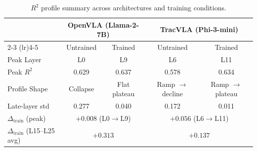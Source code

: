 \begin{table}[t]
\centering
\caption{$R^2$ profile summary across architectures and training conditions.}
\label{tab:2x2_r2_summary}
\begin{tabular}{lcccc}
\toprule
 & \multicolumn{2}{c}{OpenVLA (Llama-2-7B)} & \multicolumn{2}{c}{TracVLA (Phi-3-mini)} \\
\cmidrule(lr){2-3} \cmidrule(lr){4-5}
 & Untrained & Trained & Untrained & Trained \\
\midrule
Peak Layer       & L0          & L9          & L6          & L11         \\
Peak $R^2$       & 0.629       & 0.637       & 0.578       & 0.634       \\
Profile Shape    & Collapse    & Flat plateau & Ramp $\to$ decline & Ramp $\to$ plateau \\
Late-layer std   & 0.277       & 0.040       & 0.172       & 0.011       \\
$\Delta_{\text{train}}$ (peak) & \multicolumn{2}{c}{$+0.008$ (L0$\to$L9)} & \multicolumn{2}{c}{$+0.056$ (L6$\to$L11)} \\
$\Delta_{\text{train}}$ (L15--L25 avg) & \multicolumn{2}{c}{$+0.313$} & \multicolumn{2}{c}{$+0.137$} \\
\bottomrule
\end{tabular}
\end{table}
